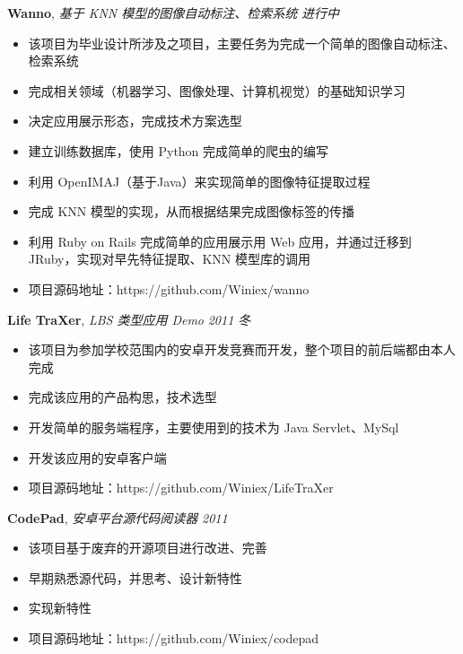 \documentclass[9pt]{ctexart}
\newenvironment{changemargin}[2]{%
    \begin{list}{}{%
            \setlength{\topsep}{0pt}%
            \setlength{\leftmargin}{#1}%
            \setlength{\rightmargin}{#2}%
            \setlength{\listparindent}{\parindent}%
        \setlength{\itemindent}{\parindent}%
            \setlength{\parsep}{\parskip}%
        }%
  \item[]}{\end{list}
      }
\newenvironment{body} {
          \vspace*{-16pt}
          \begin{changemargin}{-0.25in}{-0.5in}
          }	
      {\end{changemargin}
      }
\begin{document}
      \begin{body}
          \vspace{14pt}
          \textbf{Wanno}, \emph{基于 KNN 模型的图像自动标注、检索系统} \hfill \emph{进行中}\\
          \vspace*{-4pt}
      \begin{itemize} \itemsep -0pt  %
              \item 该项目为毕业设计所涉及之项目，主要任务为完成一个简单的图像自动标注、检索系统
              \item 完成相关领域（机器学习、图像处理、计算机视觉）的基础知识学习
              \item 决定应用展示形态，完成技术方案选型
              \item 建立训练数据库，使用 Python 完成简单的爬虫的编写
              \item 利用 OpenIMAJ（基于Java）来实现简单的图像特征提取过程
              \item 完成 KNN 模型的实现，从而根据结果完成图像标签的传播
              \item 利用 Ruby on Rails 完成简单的应用展示用 Web 应用，并通过迁移到 JRuby，实现对早先特征提取、KNN 模型库的调用
              \item 项目源码地址：https://github.com/Winiex/wanno
          \end{itemize}

          \newpage

          \textbf{Life TraXer}, \emph{LBS 类型应用 Demo} \hfill \emph{2011 冬}\\
          \vspace*{-4pt}
      \begin{itemize} \itemsep -0pt  %
              \item 该项目为参加学校范围内的安卓开发竞赛而开发，整个项目的前后端都由本人完成
              \item 完成该应用的产品构思，技术选型
              \item 开发简单的服务端程序，主要使用到的技术为 Java Servlet、MySql
              \item 开发该应用的安卓客户端
              \item 项目源码地址：https://github.com/Winiex/LifeTraXer
          \end{itemize}

          \textbf {CodePad}, \emph{安卓平台源代码阅读器} \hfill \emph{2011}\\
          \vspace*{-4pt}
      \begin{itemize} \itemsep -0pt
              \item 该项目基于废弃的开源项目进行改进、完善
              \item 早期熟悉源代码，并思考、设计新特性
              \item 实现新特性
              \item 项目源码地址：https://github.com/Winiex/codepad
          \end{itemize}


\end{body}
\end{document}

